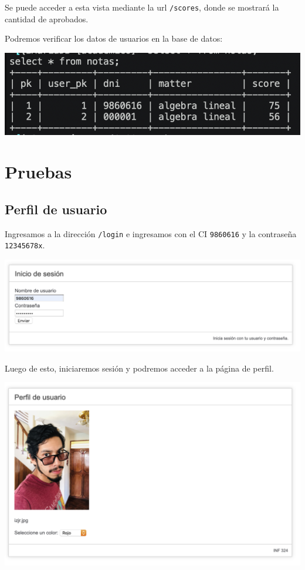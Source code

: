 \documentclass[letter]{article}
\begin{document}
Se puede acceder a esta vista mediante la url \texttt{/scores}, donde se mostrará la
cantidad de aprobados.

Podremos verificar los datos de usuarios en la base de datos:

\begin{center}
\includegraphics[width=.9\linewidth]{./img/scoredb.png}
\end{center}

\section{Pruebas}
\label{sec:org28bb55f}
\subsection{Perfil de usuario}
\label{sec:org5b3e4d1}
Ingresamos a la dirección \texttt{/login} e ingresamos con el CI \texttt{9860616} y la
contraseña \texttt{12345678x}.

\begin{center}
\includegraphics[width=.9\linewidth]{./img/login.png}
\end{center}

Luego de esto, iniciaremos sesión y podremos acceder a la página de perfil.

\begin{center}
\includegraphics[width=.9\linewidth]{./img/perfil.png}
\end{center}
\end{document}

